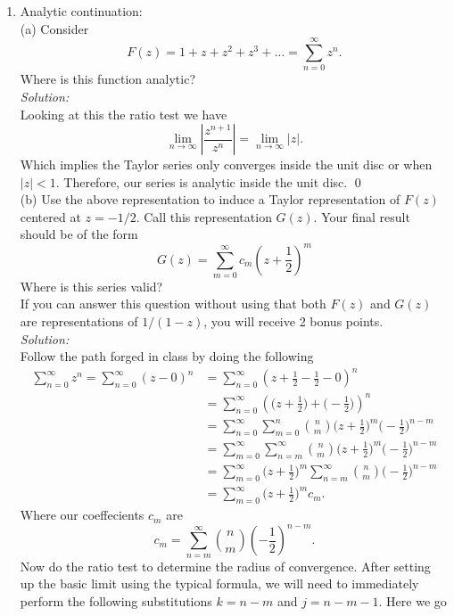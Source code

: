 \documentclass[10pt]{amsart}
\theoremstyle{nonumberplain}
\begin{document}
\begin{enumerate}[label={\bf {\arabic*}:}]
\item Analytic continuation: \\
(a) Consider
$$
F(z)=1+z+z^2+z^3+\ldots=\sum_{n=0}^{\infty} z^n .
$$
Where is this function analytic? \\
\textit{Solution:} \\
Looking at this the ratio test we have
$$
\lim_{n \rightarrow \infty} \left| \frac {z^{n + 1}}{z^n} \right| = \lim_{n \rightarrow \infty}\left| z\right|.
$$
Which implies the Taylor series only converges inside the unit disc or when $|z| < 1$.
Therefore, our series is analytic inside the unit disc.
\qed \\

\noindent
(b) Use the above representation to induce a Taylor representation of $F(z)$ centered at $z=-1 / 2$. Call this representation $G(z)$. Your final result should be of the form
$$
G(z)=\sum_{m=0}^{\infty} c_m\left(z+\frac{1}{2}\right)^m
$$
Where is this series valid? \\
If you can answer this question without
using that both $F(z)$ and $G(z)$ are representations of $1 /(1-z)$,
you will receive 2 bonus points.\\
\textit{Solution:} \\
Follow the path forged in class by doing the following
\begin{align*}
\sum_{n=0}^{\infty}z^n = \sum_{n=0}^{\infty}(z - 0)^n &= \sum_{n=0}^{\infty}\left(z + \frac 1 2 - \frac 1 2 - 0\right)^n \\
	&= \sum_{n=0}^{\infty}\left(\big(z + \frac 1 2\big) + \big(-\frac 1 2\big)\right)^n \\
	&= \sum_{n=0}^{\infty} \sum_{m=0}^n {n \choose m}\bigg(z + \frac 1 2\bigg)^m\bigg(-\frac 1 2\bigg)^{n - m} \\
	&= \sum_{m=0}^{\infty} \sum_{n=m}^\infty {n \choose m}\bigg(z + \frac 1 2\bigg)^m\bigg(-\frac 1 2\bigg)^{n - m} \\
	&= \sum_{m=0}^{\infty}\bigg(z + \frac 1 2\bigg)^m \sum_{n=m}^\infty {n \choose m} \bigg(-\frac 1 2\bigg)^{n - m} \\
	&= \sum_{m=0}^{\infty}\bigg(z + \frac 1 2\bigg)^m c_m.
\end{align*}
Where our coeffecients $c_m$ are
$$
c_m = \sum_{n=m}^\infty {n \choose m} \left(-\frac 1 2\right)^{n - m}.
$$
Now do the ratio test to determine the radius of convergence.
After setting up the basic limit using the typical formula, we will need to immediately perform the following substitutions
$k = n - m$ and $j = n - m - 1$. 
Here we go
\begin{align*}

\end{align*}
\end{enumerate}
\end{document}
